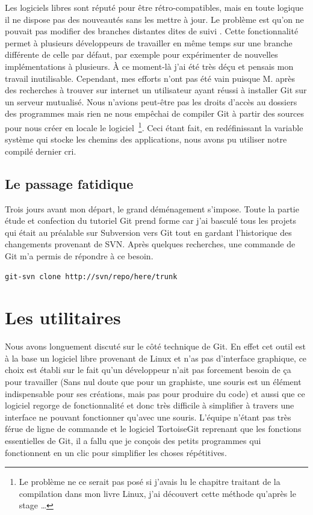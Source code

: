 Les logiciels libres sont réputé pour être rétro-compatibles, mais en toute
logique il ne dispose pas des nouveautés sans les mettre à jour. Le problème
est qu'on ne pouvait pas modifier des branches distantes dites \og de suivi
\fg{}. Cette fonctionnalité permet à plusieurs développeurs de travailler en
même temps sur une branche différente de celle par défaut, par exemple pour
expérimenter de nouvelles implémentations à plusieurs. À ce moment-là j'ai été
très déçu et pensais mon travail inutilisable. Cependant, mes efforts n'ont pas
été vain puisque M. après des recherches à trouver sur internet un
utilisateur ayant réussi à installer Git sur un serveur mutualisé. Nous
n'avions peut-être pas les droits d'accès au dossiers des programmes mais rien
ne nous empêchai de compiler Git à partir des sources pour nous créer en locale
le logiciel\, \footnote{Le problème ne ce serait pas posé si j'avais lu le
chapitre traitant de la compilation dans mon livre Linux, j'ai découvert cette
méthode qu'après le stage \ldots{}}. Ceci étant fait, en redéfinissant la variable
système qui stocke les chemins des applications, nous avons pu utiliser notre
compilé dernier cri.


\subsection{Le passage fatidique} %

Trois jours avant mon départ, le grand déménagement s'impose. Toute la partie
étude et confection du tutoriel Git prend forme car j'ai basculé tous les
projets qui était au préalable sur Subversion vers Git tout en gardant
l'historique des changements provenant de SVN. Après quelques recherches, une
commande de Git m'a permis de répondre à ce besoin.

\begin{lstlisting}
git-svn clone http://svn/repo/here/trunk
\end{lstlisting}

\section{Les utilitaires} %

Nous avons longuement discuté sur le côté technique de Git. En effet cet outil
est à la base un logiciel libre provenant de Linux et n'as pas d'interface
graphique, ce choix est établi sur le fait qu'un développeur n'ait pas
forcement besoin de ça pour travailler (Sans nul doute que pour un graphiste,
une souris est un élément indispensable pour ses créations, mais pas pour
produire du code) et aussi que ce logiciel regorge de fonctionnalité et donc
très difficile à simplifier à travers une interface ne pouvant fonctionner
qu'avec une souris. L'équipe n'étant pas très férue de ligne de commande et le
logiciel TortoiseGit reprenant que les fonctions essentielles de Git, il a
fallu que je conçois des petits programmes qui fonctionnent en un clic pour
simplifier les choses répétitives.

